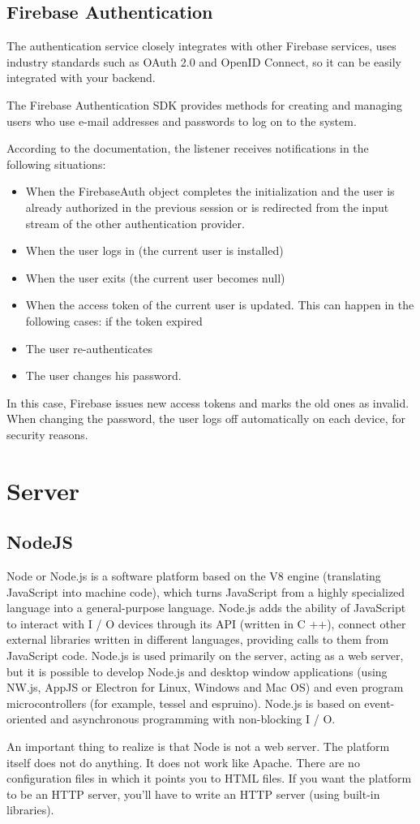 \subsection{Firebase Authentication}
The authentication service closely integrates with other Firebase services, uses industry standards such as OAuth 2.0 and OpenID Connect, so it can be easily integrated with your backend.\par
The Firebase Authentication SDK provides methods for creating and managing users who use e-mail addresses and passwords to log on to the system.\par
According to the documentation, the listener receives notifications in the following situations:
\begin{itemize}
\item When the FirebaseAuth object completes the initialization and the user is already authorized in the previous session or is redirected from the input stream of the other authentication provider.
\item When the user logs in (the current user is installed)
\item When the user exits (the current user becomes null)
\item When the access token of the current user is updated. This can happen in the following cases:
if the token expired
\item The user re-authenticates
\item The user changes his password.
\end{itemize}
In this case, Firebase issues new access tokens and marks the old ones as invalid. When changing the password, the user logs off automatically on each device, for security reasons. \cite{Firebase}

\section{Server}

\subsection{NodeJS}
Node or Node.js is a software platform based on the V8 engine (translating JavaScript into machine code), which turns JavaScript from a highly specialized language into a general-purpose language. Node.js adds the ability of JavaScript to interact with I / O devices through its API (written in C ++), connect other external libraries written in different languages, providing calls to them from JavaScript code. Node.js is used primarily on the server, acting as a web server, but it is possible to develop Node.js and desktop window applications (using NW.js, AppJS or Electron for Linux, Windows and Mac OS) and even program microcontrollers (for example, tessel and espruino). Node.js is based on event-oriented and asynchronous programming with non-blocking I / O. \par 
An important thing to realize is that Node is not a web server. The platform itself does not do anything. It does not work like Apache. There are no configuration files in which it points you to HTML files. If you want the platform to be an HTTP server, you'll have to write an HTTP server (using built-in libraries).
\cite{NodeJS}

